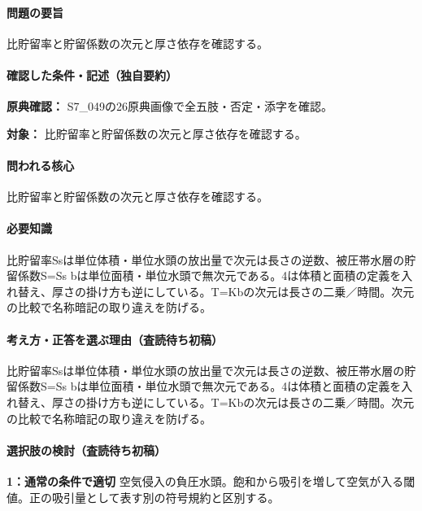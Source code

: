 \paragraph{問題の要旨} 比貯留率と貯留係数の次元と厚さ依存を確認する。

\paragraph{確認した条件・記述（独自要約）}\mbox{}\par

\noindent\textbf{原典確認：} S7\_049の26原典画像で全五肢・否定・添字を確認。\par

\noindent\textbf{対象：} 比貯留率と貯留係数の次元と厚さ依存を確認する。\par

\paragraph{問われる核心} 比貯留率と貯留係数の次元と厚さ依存を確認する。

\paragraph{必要知識} 比貯留率Ssは単位体積・単位水頭の放出量で次元は長さの逆数、被圧帯水層の貯留係数S=\allowbreak{}Ss bは単位面積・単位水頭で無次元である。4は体積と面積の定義を入れ替え、厚さの掛け方も逆にしている。T=\allowbreak{}Kbの次元は長さの二乗／時間。次元の比較で名称暗記の取り違えを防げる。

\paragraph{考え方・正答を選ぶ理由（査読待ち初稿）} 比貯留率Ssは単位体積・単位水頭の放出量で次元は長さの逆数、被圧帯水層の貯留係数S=\allowbreak{}Ss bは単位面積・単位水頭で無次元である。4は体積と面積の定義を入れ替え、厚さの掛け方も逆にしている。T=\allowbreak{}Kbの次元は長さの二乗／時間。次元の比較で名称暗記の取り違えを防げる。

\paragraph{選択肢の検討（査読待ち初稿）}\mbox{}\par

\noindent\textbf{1：通常の条件で適切} 空気侵入の負圧水頭。飽和から吸引を増して空気が入る閾値。正の吸引量として表す別の符号規約と区別する。\par

